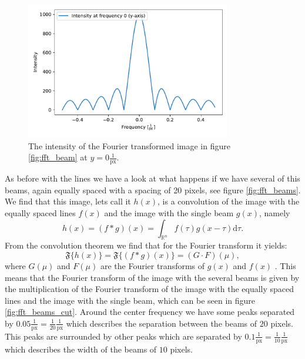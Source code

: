 \begin{figure}[H]
	\centering
		\includegraphics[width=0.8\textwidth]{pics/fft_simulation_cutonebeam.pdf}
		\caption{The intensity of the Fourier transformed image in figure \ref{fig:fft_beam} at $y=0 \frac{1}{\mathrm{px}}$.}
		\label{fig:fft_beam_cut}
\end{figure}
As before with the lines we have a look at what happens if we have several of this beams, again equally spaced with a spacing of 20 pixels, see figure \ref{fig:fft_beams}. We find that this image, lets call it $h(x)$, is a convolution of the image with the equally spaced lines $f(x)$ and the image with the single beam $g(x)$, namely
\begin{equation}
	h(x) = (f * g)(x) = \int_{\mathbb{R}^n} f(\tau)g(x-\tau) \mathrm{d}\tau .
\end{equation}
From the convolution theorem we find that for the Fourier transform it yields:
\begin{equation}
	\mathfrak{F}\{h(x)\} = \mathfrak{F}\{(f * g)(x)\} = (G \cdot F)(\mu),
\end{equation}
where $G(\mu)$ and $F(\mu)$ are the Fourier transforms of $g(x)$ and $f(x)$ \cite{ImageProcessing}. This means that the Fourier transform of the image with the several beams is given by the multiplication of the Fourier transform of the image with the equally spaced lines and the image with the single beam, which can be seen in figure \ref{fig:fft_beams_cut}. Around the center frequency we have some peaks separated by $0.05 \frac{1}{\mathrm{px}} = \frac{1}{20} \frac{1}{\mathrm{px}}$ which describes the separation between the beams of $20$ pixels. This peaks are surrounded by other peaks which are separated by $0.1 \frac{1}{\mathrm{px}} = \frac{1}{10} \frac{1}{\mathrm{px}}$ which describes the width of the beams of $10$ pixels.
